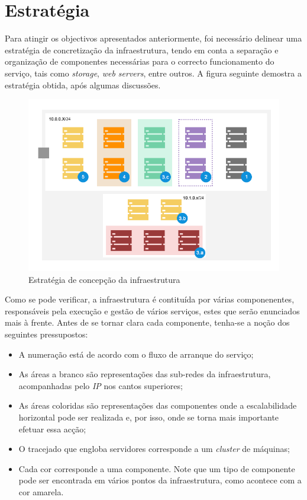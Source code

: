 \section{Estratégia}

Para atingir os objectivos apresentados anteriormente, foi necessário delinear uma estratégia de concretização da infraestrutura, tendo em conta a separação e organização de componentes necessárias para o correcto funcionamento do serviço, tais como \emph{storage}, \emph{web servers}, entre outros.
A figura seguinte demostra a estratégia obtida, após algumas discussões.

\begin{figure}[ht]
\centerline{\includegraphics[width=1\textwidth]{images/infrastructure/strategy}}
\label{fig:infrastructure-strategy}
\caption{Estratégia de concepção da infraestrutura}
\end{figure}

Como se pode verificar, a infraestrutura é contituída por várias componenentes, responsáveis pela execução e gestão de vários serviços, estes que serão enunciados mais à frente. Antes de se tornar clara cada componente, tenha-se a noção dos seguintes pressupostos:

\begin{itemize}
	\item A numeração está de acordo com o fluxo de arranque do serviço;
	\item As áreas a branco são representações das sub-redes da infraestrutura, acompanhadas pelo \emph{IP} nos cantos superiores;
	\item As áreas coloridas são representações das componentes onde a escalabilidade horizontal pode ser realizada e, por isso, onde se torna mais importante efetuar essa acção;
	\item O tracejado que engloba servidores corresponde a um \emph{cluster} de máquinas;
	\item Cada cor corresponde a uma componente. Note que um tipo de componente pode ser encontrada em vários pontos da infraestrutura, como acontece com a cor amarela.
\end{itemize}

